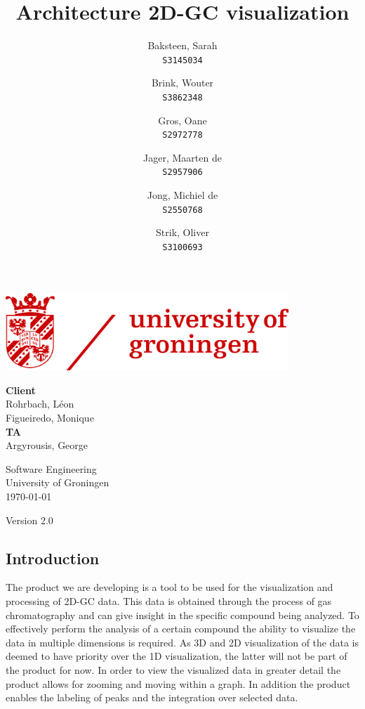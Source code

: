 \documentclass{article}
\title{Architecture 2D-GC visualization}
\author{
  Baksteen, Sarah\\
  \texttt{S3145034}
  \and
  Brink, Wouter\\
  \texttt{S3862348}
  \and
  Gros, Oane\\
  \texttt{S2972778}
  \and
  Jager, Maarten de \\
  \texttt{S2957906}
  \and
  Jong, Michiel de \\
  \texttt{S2550768}
  \and
  Strik, Oliver\\
  \texttt{S3100693}
}
\date{}
\begin{document}
\clearpage
\maketitle
\thispagestyle{empty}
\begin{center}
    \vfill
    \includegraphics[width=0.8\textwidth]{UG_logo.jpg}
    \vfill
    
    \Large
    \textbf{Client} \\
    Rohrbach, Léon \\
    Figueiredo, Monique \\
    
    \vspace{1cm}
    \textbf{TA} \\
    Argyrousis, George
    
    \vspace{2cm}
        Software Engineering \\
        University of Groningen \\
        \today \\
        \empty
        
        \vspace{1cm}
        Version 2.0
\end{center}

\newpage\setcounter{page}{1}
\subsection*{Introduction}

The product we are developing is a tool to be used for the visualization and processing of 2D-GC data. This data is obtained through the process of gas chromatography and can give insight in the specific compound being analyzed. To effectively perform the analysis of a certain compound the ability to visualize the data in multiple dimensions is required. As 3D and 2D visualization of the data is deemed to have priority over the 1D visualization, the latter will not be part of the product for now. In order to view the visualized data in greater detail the product allows for zooming and moving within a graph. In addition the product enables the labeling of peaks and the integration over selected data.
\end{document}
